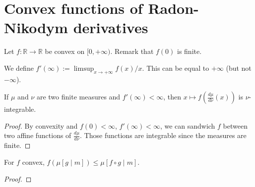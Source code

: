 \chapter{Convex functions of Radon-Nikodym derivatives}

Let $f : \mathbb{R} \to \mathbb{R}$ be convex on $[0, +\infty)$. Remark that $f(0)$ is finite.

\begin{definition}
  \label{def:derivAtTop}
  \leanok
  We define $f'(\infty) := \limsup_{x \to + \infty} f(x)/x$. This can be equal to $+\infty$ (but not $-\infty$).
\end{definition}

\begin{lemma}
  \label{lem:integrable_f_rnDeriv_of_derivAtTop_ne_top}
  \leanok
  If $\mu$ and $\nu$ are two finite measures and $f'(\infty) < \infty$, then $x \mapsto f\left(\frac{d\mu}{d\nu}(x)\right)$ is $\nu$-integrable. 
\end{lemma}

\begin{proof} \leanok
By convexity and $f(0) < \infty$, $f'(\infty)<\infty$, we can sandwich $f$ between two affine functions of $\frac{d\mu}{d\nu}$.
Those functions are integrable since the measures are finite.
\end{proof}

\begin{theorem}
  \label{thm:condexp_jensen}
  \mathlibok
  For $f$ convex, $f\left(\mu [g \mid m]\right) \le \mu [f \circ g \mid m]$.
\end{theorem}

\begin{proof}\mathlibok
\end{proof}
